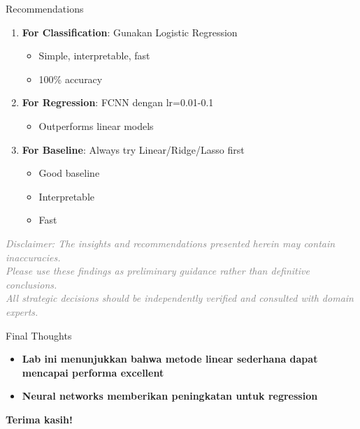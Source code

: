 \documentclass[aspectratio=169]{beamer}
\newcommand{\hl}[1]{\textcolor{AWSOrange}{\textbf{#1}}}
\newcommand{\hlb}[1]{\textcolor{AWSBlue}{\textbf{#1}}}
\begin{document}
\begin{frame}{Recommendations}
\fontsize{10}{11}\selectfont

\begin{enumerate}
    \item \textbf{For Classification}: Gunakan Logistic Regression
    \begin{itemize}
        \item Simple, interpretable, fast
        \item 100\% accuracy
    \end{itemize}
    
    \item \textbf{For Regression}: FCNN dengan lr=0.01-0.1
    \begin{itemize}
        \item Outperforms linear models
    \end{itemize}
    
    \item \textbf{For Baseline}: Always try Linear/Ridge/Lasso first
    \begin{itemize}
        \item Good baseline
        \item Interpretable
        \item Fast
    \end{itemize}
\end{enumerate}
\end{frame}

\begin{frame}
\begin{center}
\textit{\textcolor{gray}{Disclaimer: The insights and recommendations presented herein may contain inaccuracies. \\ Please use these findings as preliminary guidance rather than definitive conclusions. \\ All strategic decisions should be independently verified and consulted with domain experts.}}
\end{center}
\end{frame}

\begin{frame}{Final Thoughts}
\begin{itemize}
\item \hlb{Lab ini menunjukkan bahwa metode linear sederhana dapat mencapai performa excellent}
\item \hl{Neural networks memberikan peningkatan untuk regression}
\end{itemize}
\vspace{0.3in}
\textbf{Terima kasih!}
\end{frame}
\end{document}
